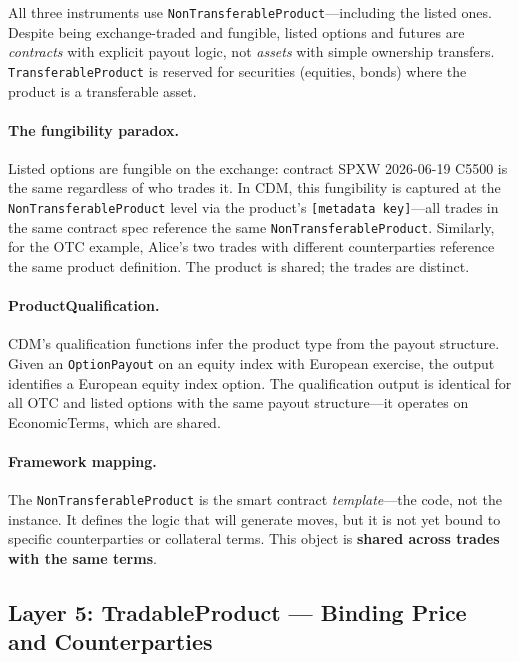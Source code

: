 \documentclass[11pt,a4paper]{article}
\begin{document}
\noindent All three instruments use \texttt{NonTransferableProduct}---including the listed ones. Despite being exchange-traded and fungible, listed options and futures are \emph{contracts} with explicit payout logic, not \emph{assets} with simple ownership transfers. \texttt{TransferableProduct} is reserved for securities (equities, bonds) where the product is a transferable asset.

\paragraph{The fungibility paradox.} Listed options are fungible on the exchange: contract SPXW 2026-06-19 C5500 is the same regardless of who trades it. In CDM, this fungibility is captured at the \texttt{NonTransferableProduct} level via the product's \texttt{[metadata key]}---all trades in the same contract spec reference the same \texttt{NonTransferableProduct}. Similarly, for the OTC example, Alice's two trades with different counterparties reference the same product definition. The product is shared; the trades are distinct.

\paragraph{ProductQualification.} CDM's qualification functions infer the product type from the payout structure. Given an \texttt{OptionPayout} on an equity index with European exercise, the output identifies a European equity index option. The qualification output is identical for all OTC and listed options with the same payout structure---it operates on EconomicTerms, which are shared.

\paragraph{Framework mapping.} The \texttt{NonTransferableProduct} is the smart contract \textit{template}---the code, not the instance. It defines the logic that will generate moves, but it is not yet bound to specific counterparties or collateral terms. This object is \textbf{shared across trades with the same terms}.

\subsection{Layer 5: TradableProduct --- Binding Price and Counterparties}
\label{sec:cdm-tradable}
\end{document}
